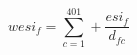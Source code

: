 \documentclass[preview]{standalone}
\begin{document}
  \begin{equation} \tag{1}
    wesi_f=\sum_{c=1}^{401}+\frac{esi_f}{d_{fc}}
  \end{equation}
\end{document}
